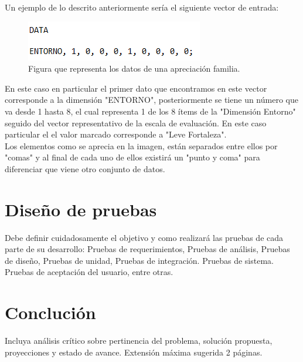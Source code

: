 Un ejemplo de lo descrito anteriormente sería el siguiente vector de entrada: 

\begin{figure}[h!]
	\label{data}
	\begin{center}
		\includegraphics[scale=0.4]{imagenes/data.png}
		\caption{Figura que representa los datos de una apreciación familia.}
	\end{center}
\end{figure}

En este caso en particular el primer dato que encontramos en este vector corresponde a la dimensión "ENTORNO", posteriormente se tiene un número que va desde 1 hasta 8, el cual representa 1 de los 8 ítems de la "Dimensión Entorno" seguido del vector representativo de la escala de evaluación. En este caso particular el el valor marcado corresponde a "Leve Fortaleza".\\

Los elementos como se aprecia en la imagen, están separados entre ellos por "comas" y al final de cada uno de ellos existirá un "punto y coma" para diferenciar que viene otro conjunto de datos. \\

\clearpage
\newpage


 \section{Diseño de pruebas}
 Debe definir cuidadosamente el objetivo y como realizará las pruebas de cada parte de su desarrollo:  Pruebas de requerimientos, Pruebas de análisis,  Pruebas de diseño, Pruebas de unidad, Pruebas de integración. Pruebas de sistema. Pruebas de aceptación del usuario, entre otras.\\
 
 \clearpage
 \newpage


\section{Conclución}  \label{conclusiones}
Incluya análisis crítico sobre  pertinencia del problema, solución propuesta, proyecciones
y estado de avance. Extensión máxima sugerida 2 páginas.\\
\clearpage
\newpage
